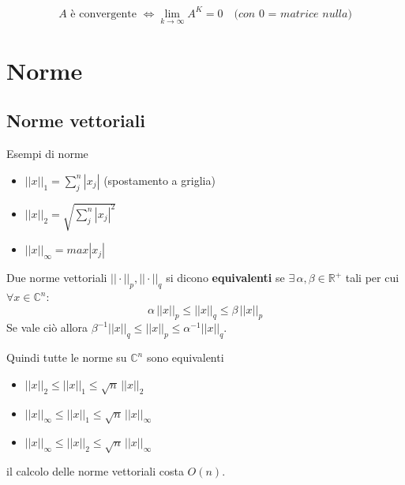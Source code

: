\documentclass[12pt,a4paper,]{report}
\begin{document}
\begin{teorema}
    \label{th: matrice convergente}
    \[
    A \text{ è convergente } \Longleftrightarrow \lim_{k\to\infty} A^K = 0 \quad \textit{(con 0 = matrice nulla)}
    \]
\end{teorema}


\begin{lezione}
    [Lezione 6 15/03]
\end{lezione}

\section{Norme}

\subsection{Norme vettoriali}
Esempi di norme
\begin{itemize}
    \item $||x||_1 = \sum^n_j |x_j|$ (spostamento a griglia)
    \item $||x||_2 = \sqrt{\sum^n_j |x_j|^2}$
    \item $||x||_\infty = max|x_j|$
\end{itemize}

\begin{definizione}
    Due norme vettoriali $||\cdot||_p, ||\cdot||_q$ si dicono \textbf{equivalenti} se $\exists \, \alpha, \beta \in \mathbb{R}^+$ tali per cui $\forall x \in \mathbb{C}^n$:
    \[
    \alpha \, ||x||_p \leq ||x||_q \leq \beta \, ||x||_p
    \]
    Se vale ciò allora $\beta^{-1} ||x||_q \leq ||x||_p \leq \alpha^{-1} ||x||_q$.
\end{definizione}
\noindent
Quindi tutte le norme su $\mathbb{C}^n$ sono equivalenti
\begin{itemize}
    \item $||x||_2 \leq ||x||_1 \leq \sqrt{n} \, ||x||_2$
    \item $||x||_\infty \leq ||x||_1 \leq \sqrt{n} \, ||x||_\infty$
    \item $||x||_\infty \leq ||x||_2 \leq \sqrt{n} \, ||x||_\infty$
\end{itemize}
\begin{nota}
    il calcolo delle norme vettoriali costa $O(n)$.
\end{nota}
\end{document}
